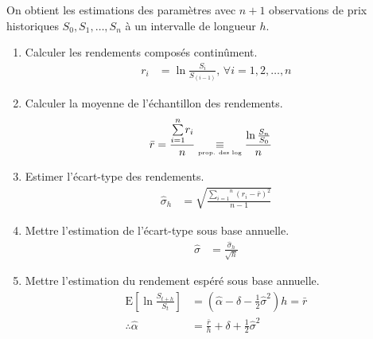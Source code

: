 \documentclass[10pt, french]{article}
\begin{document}
\begin{multicols*}{2}
\begin{definitionNOHFILL}
On obtient les estimations des paramètres avec $n + 1$ observations de prix historiques $S_{0}, S_{1}, \dots, S_{n}$ à un intervalle de longueur $h$.
\begin{enumerate}
	\item	Calculer les rendements composés continûment.
		\begin{align*}
		r_{i}
		&=	\ln\frac{S_{i}}{S_{(i - 1)}}, \, \forall i = 1, 2, \dots, n
		\end{align*}
	\item	Calculer la moyenne de l'échantillon des rendements.
		\begin{align*}
		\bar{r}
		&=	\frac{\overset{n}{\underset{i = 1}{\sum}} r_{i}}{n}	
		\underset{\tiny{\shortstack{prop. des log}}}{\equiv}	\frac{\ln\frac{S_{n}}{S_{0}}}{n}
		\end{align*}
	\item	Estimer l'écart-type des rendements.
		\begin{align*}
		\hat{\sigma}_{h}
		&=	\sqrt{\frac{\overset{n}{\underset{i = 1}{\sum}} (r_{i} - \bar{r})^{2}}{n - 1}}
		\end{align*}
	\item	Mettre l'estimation de l'écart-type sous base annuelle.
		\begin{align*}
		\hat{\sigma}
		&=	\frac{\hat{\sigma}_{h}}{\sqrt{h}}
		\end{align*}
	\item	Mettre l'estimation du rendement espéré sous base annuelle.
		\begin{align*}
		\text{E}\left[\ln\frac{S_{t + h}}{S_{t}}\right]
		&=
		\left(\hat{\alpha} - \delta - \frac{1}{2} \hat{\sigma}^{2}\right)h	
		=	\bar{r}	\\
		\therefore \hat{\alpha}	&=	\frac{\bar{r}}{h} + \delta + \frac{1}{2} \hat{\sigma}^{2}
		\end{align*}
\end{enumerate}
\end{definitionNOHFILL}

\columnbreak


\end{multicols*}
\end{document}
